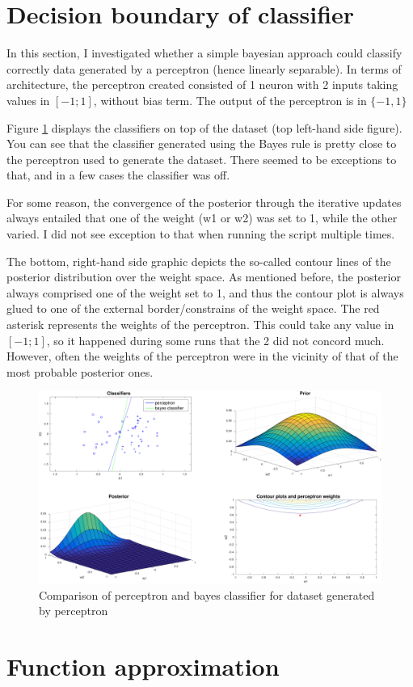 \documentclass[11pt, a4paper]{article}
\begin{document}
\section{Decision boundary of classifier}

In this section, I investigated whether a simple bayesian approach
could classify correctly data generated by a perceptron (hence
linearly separable). In terms of architecture, the perceptron created
consisted of 1 neuron with 2 inputs taking values in $[-1; 1]$,
without bias term. The output of the perceptron is in $\{-1, 1\}$

Figure \ref{fig:perceptron_bayes} displays the classifiers on top of
the dataset (top left-hand side figure). You can see that the
classifier generated using the Bayes rule is pretty close to the
perceptron used to generate the dataset. There seemed to be exceptions
to that, and in a few cases the classifier was off. 

For some reason, the convergence of the posterior through the
iterative updates always entailed that one of the weight (w1 or w2)
was set to 1, while the other varied. I did not see exception to that
when running the script multiple times.

The bottom, right-hand side graphic depicts the so-called contour
lines of the posterior distribution over the weight space. As
mentioned before, the posterior always comprised one of the weight set
to 1, and thus the contour plot is always glued to one of the external
border/constrains of the weight space. The red asterisk represents the
weights of the perceptron. This could take any value in $[-1; 1]$, so
it happened during some runs that the 2 did not concord much. However,
often the weights of the perceptron were in the vicinity of that of
the most probable posterior ones.

\begin{figure}[H]
    \centering
    \includegraphics[scale=.40]{perceptron_bayes.pdf}
    \caption{Comparison of perceptron and bayes classifier for dataset
      generated by perceptron}
    \label{fig:perceptron_bayes}
\end{figure}


\section{Function approximation}

 

\end{document}
